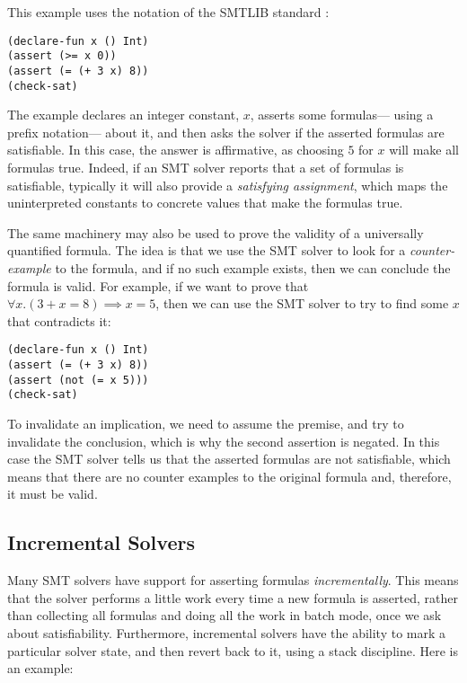 \documentclass{sigplanconf}
\begin{document}
This example uses the notation of the SMTLIB standard \cite{smtlib2}:

\begin{Verbatim}
(declare-fun x () Int)
(assert (>= x 0))
(assert (= (+ 3 x) 8))
(check-sat)
\end{Verbatim}

The example declares an integer constant, $x$, asserts some formulas---%
using a prefix notation---%
about it, and then asks the solver if the asserted formulas are
satisfiable.  In this case, the answer is affirmative, as choosing
$5$ for $x$ will make all formulas true.  Indeed, if an
SMT solver reports that a set of formulas is satisfiable, typically
it will also provide a {\em satisfying assignment}, which maps
the uninterpreted constants to concrete values that make the
formulas true.

The same machinery may also be used to prove the validity of
a universally quantified formula. The idea is that we use the SMT solver
to look for a {\em counter-example} to the formula, and if no such
example exists, then we can conclude the formula is valid.
For example, if we want to prove that $\forall x. (3 + x = 8) \implies x = 5$,
then we can use the SMT solver to try to find some $x$ that contradicts it:

\break

\begin{Verbatim}
(declare-fun x () Int)
(assert (= (+ 3 x) 8))
(assert (not (= x 5)))
(check-sat)
\end{Verbatim}

To invalidate an implication, we need to assume the premise, and try to
invalidate the conclusion, which is why the second assertion is negated.
In this case the SMT solver tells us that the asserted formulas are not
satisfiable, which means that there are no counter examples to the original
formula and, therefore, it must be valid.

\subsection{Incremental Solvers}

Many SMT solvers have support for asserting formulas {\em incrementally}.
This means that the solver performs a little work every time a new formula
is asserted, rather than collecting all formulas and doing all the work
in batch mode, once we ask about satisfiability.  Furthermore, incremental
solvers have the ability to mark a particular solver state, and then revert
back to it, using a stack discipline.  Here is an example:
\end{document}
